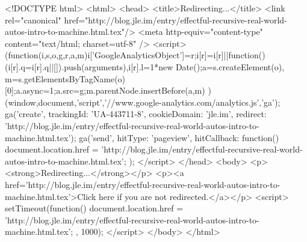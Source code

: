 <!DOCTYPE html>
<html>
<head>
<title>Redirecting...</title>
<link rel="canonical" href="http://blog.jle.im/entry/effectful-recursive-real-world-autos-intro-to-machine.html.tex"/>
<meta http-equiv="content-type" content="text/html; charset=utf-8" />
<script>
(function(i,s,o,g,r,a,m){i['GoogleAnalyticsObject']=r;i[r]=i[r]||function(){
(i[r].q=i[r].q||[]).push(arguments)},i[r].l=1*new Date();a=s.createElement(o),
m=s.getElementsByTagName(o)[0];a.async=1;a.src=g;m.parentNode.insertBefore(a,m)
})(window,document,'script','//www.google-analytics.com/analytics.js','ga');
ga('create', { trackingId: 'UA-443711-8', cookieDomain: 'jle.im', redirect: 'http://blog.jle.im/entry/effectful-recursive-real-world-autos-intro-to-machine.html.tex'});
ga('send', { hitType: 'pageview', hitCallback: function() { document.location.href = 'http://blog.jle.im/entry/effectful-recursive-real-world-autos-intro-to-machine.html.tex'; } });
</script>
</head>
<body>
  <p><strong>Redirecting...</strong></p>
  <p><a href='http://blog.jle.im/entry/effectful-recursive-real-world-autos-intro-to-machine.html.tex'>Click here if you are not redirected.</a></p>
  <script>
    setTimeout(function() { document.location.href = 'http://blog.jle.im/entry/effectful-recursive-real-world-autos-intro-to-machine.html.tex'; }, 1000);
  </script>
</body>
</html>
